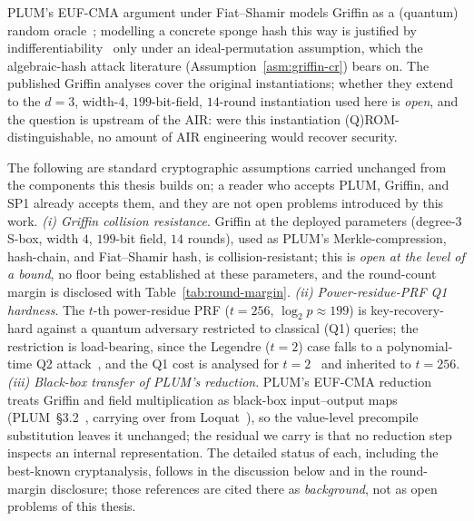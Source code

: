 \begin{assumption}\label{asm:qrom}
    PLUM's EUF-CMA argument under Fiat--Shamir models Griffin as a (quantum) random oracle~\cite{cryptoeprint:2019/190,grilo2021qrom}; modelling a concrete sponge hash this way is justified by indifferentiability~\cite{bertoni2008sponge} only under an ideal-permutation assumption, which the algebraic-hash attack literature (Assumption~\ref{asm:griffin-cr}) bears on. The published Griffin analyses cover the original instantiations; whether they extend to the $d=3$, width-$4$, $199$-bit-field, $14$-round instantiation used here is \emph{open}, and the question is upstream of the AIR: were this instantiation (Q)ROM-distinguishable, no amount of AIR engineering would recover security.
\end{assumption}

\begin{assumption}\label{asm:inherited}
    The following are standard cryptographic assumptions carried unchanged from the components this thesis builds on; a reader who accepts PLUM, Griffin, and SP1 already accepts them, and they are not open problems introduced by this work. \emph{(i) Griffin collision resistance}. Griffin at the deployed parameters (degree-$3$ S-box, width $4$, $199$-bit field, $14$ rounds), used as PLUM's Merkle-compression, hash-chain, and Fiat--Shamir hash, is collision-resistant; this is \emph{open at the level of a bound}, no floor being established at these parameters, and the round-count margin is disclosed with Table~\ref{tab:round-margin}. \emph{(ii) Power-residue-PRF Q1 hardness}. The $t$-th power-residue PRF ($t=256$, $\log_2 p\approx199$) is key-recovery-hard against a quantum adversary restricted to classical (Q1) queries; the restriction is load-bearing, since the Legendre ($t{=}2$) case falls to a polynomial-time Q2 attack~\cite{vandamhallgrenip2006}, and the Q1 cost is analysed for $t{=}2$~\cite{frixons2021quantum} and inherited to $t=256$. \emph{(iii) Black-box transfer of PLUM's reduction}. PLUM's EUF-CMA reduction treats Griffin and field multiplication as black-box input--output maps (PLUM~\S3.2~\cite{10.1007/978-981-95-2961-2_6}, carrying over from Loquat~\cite{cryptoeprint:2024/868}), so the value-level precompile substitution leaves it unchanged; the residual we carry is that no reduction step inspects an internal representation. The detailed status of each, including the best-known cryptanalysis, follows in the discussion below and in the round-margin disclosure; those references are cited there as \emph{background}, not as open problems of this thesis.
\end{assumption}

